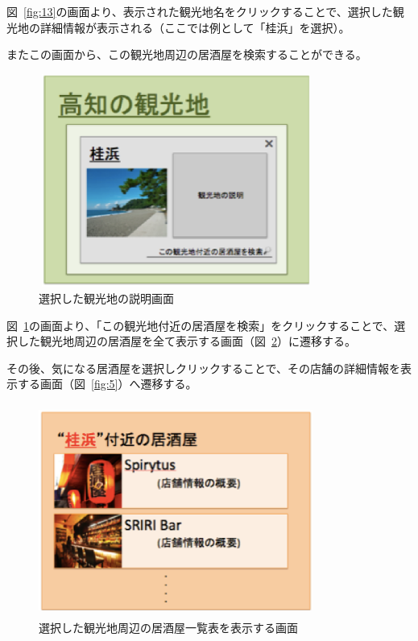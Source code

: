 \documentclass[a4j,titlepage]{jarticle}
\begin{document}
図~\ref{fig:13}の画面より、表示された観光地名をクリックすることで、選択した観光地の詳細情報が表示される（ここでは例として「桂浜」を選択）。



またこの画面から、この観光地周辺の居酒屋を検索することができる。






\begin {figure}[!htbp]
    \begin{center}
    \includegraphics [height=7cm, width=9cm]{14.eps}
    \caption {選択した観光地の説明画面}
    \label {fig:14}
    \end{center}
\end {figure}



図~\ref{fig:14}の画面より、「この観光地付近の居酒屋を検索」をクリックすることで、選択した観光地周辺の居酒屋を全て表示する画面（図~\ref{fig:15}）に遷移する。



その後、気になる居酒屋を選択しクリックすることで、その店舗の詳細情報を表示する画面（図~\ref{fig:5}）へ遷移する。
\clearpage
\begin {figure}[!htbp]
    \begin{center}
    \includegraphics [height=7cm, width=9cm]{15.eps}
    \caption {選択した観光地周辺の居酒屋一覧表を表示する画面}
    \label {fig:15}
    \end{center}
\end {figure}
\end{document}
